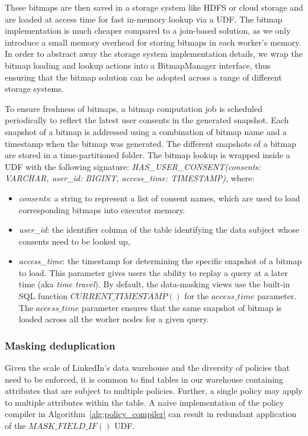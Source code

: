 These bitmaps are then saved in a storage system like HDFS or cloud storage and are loaded at access time for fast in-memory lookup via a UDF. The bitmap implementation is much cheaper compared to a join-based solution, as we only introduce a small memory overhead for storing bitmaps in each worker's memory. In order to abstract away the storage system implementation details, we wrap the bitmap loading and lookup actions into a BitmapManager interface, thus ensuring that the bitmap solution can be adopted across a range of different storage systems.

To ensure freshness of bitmaps, a bitmap computation job is scheduled periodically to reflect the latest user consents in the generated snapshot. Each snapshot of a bitmap is addressed using a combination of bitmap name and a timestamp when the bitmap was generated. The different snapshots of a bitmap are stored in a time-partitioned folder. The bitmap lookup is wrapped inside a UDF with the following signature: 
\emph{HAS\_USER\_CONSENT(consents: VARCHAR, user\_id: BIGINT, access\_time: TIMESTAMP)}, 
where:
\begin{itemize}
    \item \emph{consents}: a string to represent a list of consent names, which are used to load corresponding bitmaps into executor memory.
    \item \emph{user\_id}: the identifier column of the table identifying the data subject whose consents need to be looked up, 
    \item \emph{access\_time}: the timestamp for determining the specific snapshot of a bitmap to load. This parameter gives users the ability to replay a query at a later time (aka {\em time travel}). By default, the data-masking views use the built-in SQL function ${CURRENT\_TIMESTAMP()}$ for the $access\_time$ parameter. The $access\_time$ parameter ensures that the same snapshot of bitmap is loaded across all the worker nodes for a given query. 
\end{itemize}

\subsubsection{Masking deduplication} 
Given the scale of LinkedIn's data warehouse and the diversity of policies that need to be enforced, it is common to find tables in our warehouse containing attributes that are subject to multiple policies. 
Further, a single policy may apply to multiple attributes within the table. A naive implementation of the policy compiler in Algorithm~\ref{alg:policy_compiler} can result in redundant application of the $MASK\_FIELD\_IF()$ UDF. 

